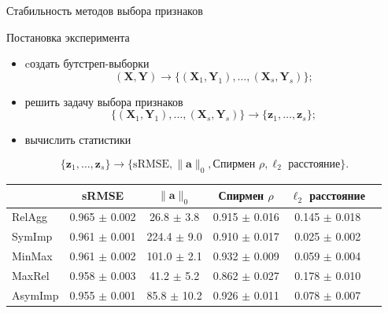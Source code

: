\documentclass[9pt]{beamer}
\newcommand{\ba}{\mathbf{a}}
\newcommand{\bz}{\mathbf{z}}
\newcommand{\bX}{\mathbf{X}}
\newcommand{\bY}{\mathbf{Y}}
\begin{document}
\begin{frame}{Стабильность методов выбора признаков}
\begin{block}{Постановка эксперимента}
	\begin{itemize}
	\item cоздать бутстреп-выборки
	\vspace{-0.1cm}
	\[
		(\bX, \bY) \rightarrow \bigl\{(\bX_1, \bY_1), \dots, (\bX_s, \bY_s)\bigr\};
	\]
	\item решить задачу выбора признаков
	\vspace{-0.1cm}
	\[
		 \bigl\{(\bX_1, \bY_1), \dots, (\bX_s, \bY_s)\bigr\}  \rightarrow \{\bz_1, \dots, \bz_s\};
	\]
	\item вычислить статистики
	\vspace{-0.1cm}
	\end{itemize}
	\[
		\{\bz_1, \dots, \bz_s\} \rightarrow \{ \text{sRMSE}, \|\ba\|_0, \text{Спирмен }\rho, \ell_2 \text{ расстояние}\}.
	\]
\end{block}
\renewcommand{\arraystretch}{1.2}
\begin{table}[]
	\centering
	\begin{tabular}{l|ccccc}
		\hline
		& sRMSE  & $\|\ba\|_0$ & Спирмен $\rho$ & $\ell_2$ расстояние \\ \hline
		RelAgg & 0.965 $\pm$ 0.002 & 26.8 $\pm$ 3.8 & 0.915 $\pm$ 0.016 & 0.145 $\pm$ 0.018   \\
		SymImp & 0.961 $\pm$ 0.001 & 224.4 $\pm$ 9.0 & 0.910 $\pm$ 0.017 & 0.025 $\pm$ 0.002   \\
		MinMax & 0.961 $\pm$ 0.002 & 101.0 $\pm$ 2.1& 0.932 $\pm$ 0.009 & 0.059 $\pm$ 0.004   \\
		MaxRel & 0.958 $\pm$ 0.003 & 41.2 $\pm$ 5.2 & 0.862 $\pm$ 0.027 & 0.178 $\pm$ 0.010   \\
		AsymImp & 0.955 $\pm$ 0.001 & 85.8 $\pm$ 10.2& 0.926 $\pm$ 0.011 & 0.078 $\pm$ 0.007  \\ \hline
	\end{tabular}
\end{table}
\end{frame}
\end{document}
